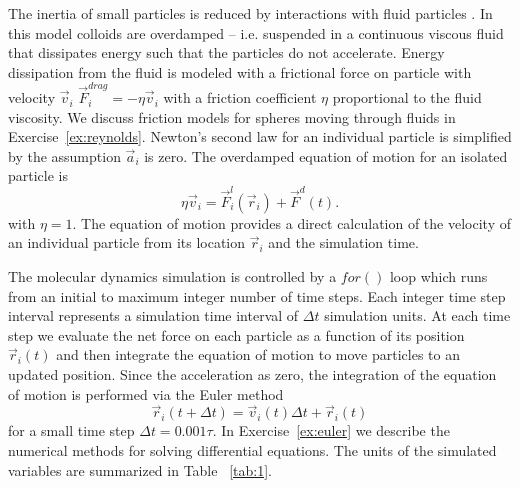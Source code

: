 \documentclass[twocolumn,preprintnumbers,amsmath,amssymb,aps,prx]{revtex4}
\begin{document}
The inertia of 
small particles is reduced by interactions
with fluid particles \cite{Purcell1977}.
In this model 
colloids are overdamped
-- i.e. suspended in a continuous viscous fluid
that dissipates energy %
such 
that the particles do not accelerate.
Energy dissipation from the fluid is modeled
with a frictional force on particle with velocity $\vec{v}_i$
$\vec{F}^{drag}_i = -\eta \vec{v}_i$
with a friction coefficient $\eta$
proportional to the fluid viscosity.
We discuss friction models for
spheres moving through fluids in 
Exercise~\ref{ex:reynolds}. %
Newton's second law for an individual particle
is simplified
by the assumption $\vec{a}_i$ is zero. %
The overdamped equation of motion for an isolated particle is
\begin{equation}
  \eta \vec{v}_i = \vec{F}^l_{i}(\vec{r}_i) + \vec{F}^{d}(t).
    \label{eq:motion}
\end{equation}
with  $\eta = 1$.  
The equation of motion provides a direct calculation of the velocity
of an individual particle from its location $\vec{r}_i$ %
and the simulation time.

The molecular dynamics simulation is controlled by a $for()$ loop
which runs from an initial to maximum integer number of time steps.
Each integer time step interval %
represents a simulation time interval of $\Delta t$ 
simulation units.  %
At each time step
we evaluate the net force on each particle as a function of its position
$\vec{r}_i(t)$
and then integrate
the equation of motion to move particles
to an updated position.
Since the acceleration as zero,
the integration of the equation of motion
is performed via 
the Euler method 
\begin{equation}
  \vec{r}_i(t+\Delta t) = \vec{v}_i(t) \Delta t + \vec{r}_i(t)
    \label{eq:euler}
\end{equation}
for a small time step $\Delta t = 0.001 \tau$.
In %
Exercise~\ref{ex:euler}
we describe 
the numerical methods for 
solving differential equations.
%
The units of the simulated variables are summarized in Table ~\ref{tab:1}.
\end{document}
